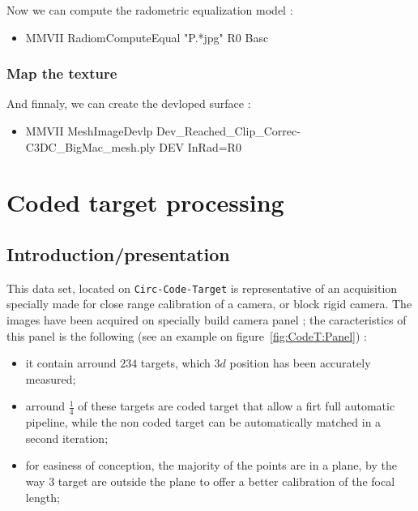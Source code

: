Now we can compute the radometric equalization model :

\begin{itemize}
     \item {MMVII RadiomComputeEqual "P.*jpg" R0 Basc}
\end{itemize}



\subsubsection{Map the texture}

And finnaly, we can create the devloped surface :


\begin{itemize}
	\item {MMVII MeshImageDevlp Dev\_Reached\_Clip\_Correc-C3DC\_BigMac\_mesh.ply  DEV InRad=R0}
\end{itemize}



\section{Coded target processing}


\subsection{Introduction/presentation}

This data set, located on {\tt Circ-Code-Target} is representative of an acquisition specially made for close 
range calibration of a camera, or block rigid camera.  The images have been
acquired on specially build camera panel ; the caracteristics of this panel
is the following (see an example on figure~\ref{fig:CodeT:Panel}) :
 

\begin{itemize}
     \item it contain arround $234$ targets, which $3d$ position has been accurately measured;

     \item arround $\frac{1}{4}$ of these targets are coded target that allow a firt full automatic pipeline,
           while the non coded target can  be automatically matched in a second iteration;

     \item for easiness of conception,  the majority of the points are in a plane, by the way $3$ target
           are outside the plane  to offer a better calibration of the focal length;
\end{itemize}


